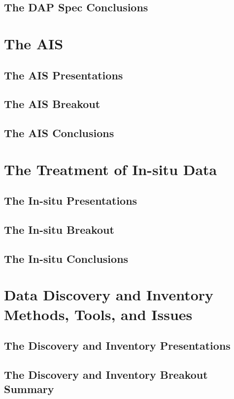 \documentclass[12pt,titlepage]{dods-paper}
\begin{document}
   \subsection{The \ac{DAP} Spec Conclusions}
       
\section{The \acs{AIS}}
   \subsection{The \ac{AIS} Presentations}
      
   \subsection{The \ac{AIS} Breakout}
      
   \subsection{The \ac{AIS} Conclusions}
      
\section{The Treatment of In-situ Data}
   \subsection{The In-situ Presentations}
      
   \subsection{The In-situ Breakout}
      
   \subsection{The In-situ Conclusions}
      
\section{Data Discovery and Inventory Methods, Tools, and Issues}
   \subsection{The Discovery and Inventory Presentations}
      
   \subsection{The Discovery and Inventory Breakout Summary}
      
\end{document}
